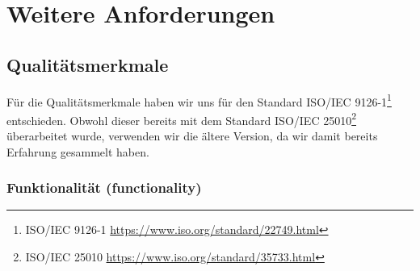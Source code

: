 \documentclass[a4paper]{article}
\let\oldsection\section
\renewcommand\section{\clearpage\oldsection}
\begin{document}
\pagebreak
\section{Weitere Anforderungen}

\subsection{Qualitätsmerkmale}

\newcommand{\isourl}[2]{ISO/IEC #1\footnote{ISO/IEC #1 \url{https://www.iso.org/standard/#2.html}}}

Für die Qualitätsmerkmale haben wir uns für den Standard \isourl{9126-1}{22749} entschieden. Obwohl dieser bereits mit dem Standard \isourl{25010}{35733} überarbeitet wurde, verwenden wir die ältere Version, da wir damit bereits Erfahrung gesammelt haben.

\subsubsection{Funktionalität (functionality)}
\end{document}
